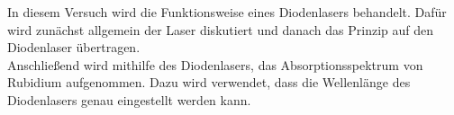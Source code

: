In diesem Versuch wird die Funktionsweise eines Diodenlasers behandelt.
Dafür wird zunächst allgemein der Laser diskutiert und danach das Prinzip auf den Diodenlaser übertragen.\\
Anschließend wird mithilfe des Diodenlasers, das Absorptionsspektrum von Rubidium aufgenommen.
Dazu wird verwendet, dass die Wellenlänge des Diodenlasers genau eingestellt werden kann.

